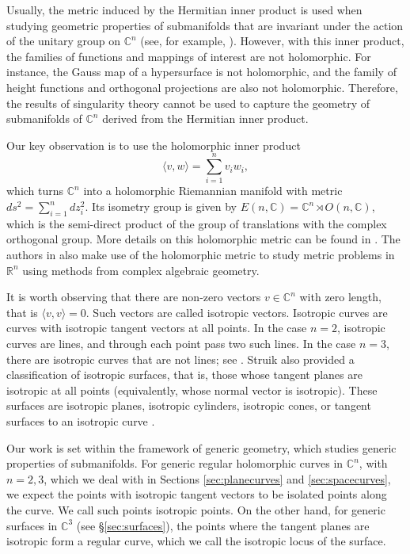 \documentclass[12pt,a4paper]{article}
\begin{document}
Usually, the metric induced by the Hermitian inner product is used when studying geometric properties of submanifolds that are invariant under the action of the unitary group on $\mathbb C^n$ (see, for example, \cite{Nomizu&Smyth}). 
However, with this inner product, the families of functions and mappings of interest are not holomorphic. 
For instance, the Gauss map of a hypersurface is not holomorphic, and the family of height functions and orthogonal projections are also not holomorphic. Therefore, the results of singularity theory
cannot be used to capture the geometry of submanifolds of $\mathbb C^n$ derived from the Hermitian inner product.

Our key observation is to use the holomorphic inner product 
\begin{equation}\label{eq:holomorphicscprod}
\langle v,w\rangle =\sum_{i=1}^{n}v_iw_i,
\end{equation}
which turns $\mathbb C^n$ into a holomorphic Riemannian manifold with metric $ds^2=\sum_{i=1}^{n}dz_i^2$. Its isometry group is given by $E(n,\mathbb C)=
\mathbb C^n\rtimes O(n,\mathbb C)$, which is the semi-direct product of the group of translations with the complex orthogonal group.
More details on this holomorphic metric can be found in \cite{PessersVeken}. The authors in \cite{MetrixAlgGeom} also make use of the holomorphic metric to study metric problems in $\mathbb R^n$ using methods from complex algebraic geometry.

It is worth observing that there are non-zero vectors $v\in \mathbb C^n$ with zero length, that is $\langle v,v\rangle=0$. Such vectors are called isotropic vectors. Isotropic curves are curves with isotropic tangent vectors at all points. 
In the case $n=2$, isotropic curves are lines, and through each point pass two such lines. In the case $n=3$, there are isotropic curves that are not lines; see \cite[Section 1.12]{Struik}.  Struik also provided a classification of isotropic surfaces, that is, those whose tangent planes are isotropic at all points (equivalently, whose normal vector is isotropic). These surfaces are isotropic planes, isotropic cylinders, isotropic cones, or tangent surfaces to an isotropic curve \cite[Section 5.6]{Struik}.

Our work is set within the framework of generic geometry, which studies generic properties of submanifolds.
For generic regular holomorphic curves in $\mathbb C^n$, with $n=2,3$, which we deal with in Sections \ref{sec:planecurves} and \ref{sec:spacecurves}, we expect the points with isotropic tangent vectors to be isolated points along the curve. We call such points isotropic points. On the other hand, for generic surfaces in $\mathbb C^3$ (see \S\ref{sec:surfaces}), the points where the tangent planes are isotropic form a regular curve, which we call the isotropic locus of the surface.
\end{document}
